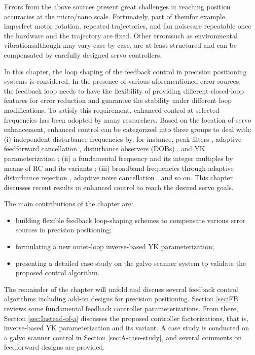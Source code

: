 \documentclass [11pt, proquest] {uwthesis}[2020/02/24]
\begin{document}
Errors from the above sources present great challenges in reaching
position accuracies at the micro/nano scale. Fortunately, part of
them\textemdash for example, imperfect motor rotation, repeated trajectories,
and fan noises\textemdash are repeatable once the hardware and the
trajectory are fixed. Other errors\textemdash such as environmental
vibrations\textemdash although may vary case by case, are at least
structured and can be compensated by carefully designed servo controllers. 

In this chapter, the loop shaping of the feedback control in precision
positioning systems is considered. In the presence of various aforementioned
error sources, the feedback loop needs to have the flexibility of
providing different closed-loop features for error reduction and guarantee
the stability under different loop modifications. To satisfy this
requirement, enhanced control at selected frequencies has been adopted
by many researchers. Based on the location of servo enhancement, enhanced
control can be categorized into three groups to deal with: (i) independent
disturbance frequencies by, for instance, peak filters \cite{li2011reset,sievers1992comparison},
adaptive feedforward cancellation \cite{Bodson1997,chen2016multirate},
disturbance observers (DOBs) \cite{XuChen_TCST2012,zheng2017design,chen2013selective},
and YK parameterization \cite{landau2005adaptive,landau2013benchmark,youla1976modern,kucera1975stability};
(ii) a fundamental frequency and its integer multiples by means of
RC and its variants \cite{chen2014new,steinbuch2007design};
(iii) broadband frequencies through adaptive disturbance rejection
\cite{de2013adaptive}, adaptive noise cancellation \cite{widrow1975adaptive},
and so on. This chapter discusses recent results in enhanced control
to reach the desired servo goals. 

The main contributions of the chapter are:
\begin{itemize}
\item building flexible feedback loop-shaping schemes to compensate various
error sources in precision positioning;
\item formulating a new outer-loop inverse-based YK parameterization;
\item presenting a detailed case study on the galvo scanner system to validate
the proposed control algorithm.
\end{itemize}
The remainder of the chapter will unfold and discuss several feedback
control algorithms including add-on designs for precision positioning.
Section \ref{sec:FB} reviews some fundamental feedback controller
parameterizations. From there, Section \ref{sec:Instead-of-a} discusses
the proposed controller factorizations, that is, inverse-based YK
parameterization and its variant. A case study is conducted on a galvo
scanner control in Section \ref{sec:A-case-study}, and several comments
on feedforward designs are provided.
\end{document}
